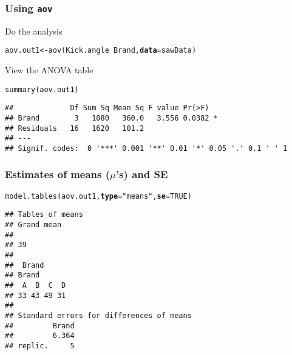 \documentclass[color=usenames,dvipsnames]{beamer}\usepackage[]{graphicx}\usepackage[]{color}
\makeatletter
\newcommand{\hlnum}[1]{\textcolor[rgb]{0.69,0.494,0}{#1}}%
\newcommand{\hlstr}[1]{\textcolor[rgb]{0.749,0.012,0.012}{#1}}%
\newcommand{\hlopt}[1]{\textcolor[rgb]{0,0,0}{#1}}%
\newcommand{\hlstd}[1]{\textcolor[rgb]{0,0,0}{#1}}%
\newcommand{\hlkwb}[1]{\textcolor[rgb]{0,0.341,0.682}{#1}}%
\newcommand{\hlkwc}[1]{\textcolor[rgb]{0,0,0}{\textbf{#1}}}%
\newcommand{\hlkwd}[1]{\textcolor[rgb]{0.004,0.004,0.506}{#1}}%
\newenvironment{kframe}{%
 \def\at@end@of@kframe{}%
 \ifinner\ifhmode%
  \def\at@end@of@kframe{\end{minipage}}%
  \begin{minipage}{\columnwidth}%
 \fi\fi%
 \def\FrameCommand##1{\hskip\@totalleftmargin \hskip-\fboxsep
 \colorbox{shadecolor}{##1}\hskip-\fboxsep
     \hskip-\linewidth \hskip-\@totalleftmargin \hskip\columnwidth}%
 \MakeFramed {\advance\hsize-\width
   \@totalleftmargin\z@ \linewidth\hsize
   \@setminipage}}%
 {\par\unskip\endMakeFramed%
 \at@end@of@kframe}
\newenvironment{knitrout}{}{} %
\makeatother
\begin{document}
\begin{frame}[fragile]
  \frametitle{Using {\tt aov}}
{%
  Do the analysis}
\begin{knitrout}
\color{fgcolor}\begin{kframe}
\begin{alltt}
\hlstd{aov.out1} \hlkwb{<-} \hlkwd{aov}\hlstd{(Kick.angle} \hlopt{~} \hlstd{Brand,} \hlkwc{data}\hlstd{=sawData)}
\end{alltt}
\end{kframe}
\end{knitrout}
\pause
\vfill
{%
  View the ANOVA table}
\begin{knitrout}\footnotesize
{}\color{fgcolor}\begin{kframe}
\begin{alltt}
\hlkwd{summary}\hlstd{(aov.out1)}
\end{alltt}
\begin{verbatim}
##             Df Sum Sq Mean Sq F value Pr(>F)  
## Brand        3   1080   360.0   3.556 0.0382 *
## Residuals   16   1620   101.2                 
## ---
## Signif. codes:  0 '***' 0.001 '**' 0.01 '*' 0.05 '.' 0.1 ' ' 1
\end{verbatim}
\end{kframe}
\end{knitrout}
\end{frame}



\begin{frame}[fragile]
  \frametitle{Estimates of means ($\mu$'s) and SE}
\begin{knitrout}
\color{fgcolor}\begin{kframe}
\begin{alltt}
\hlkwd{model.tables}\hlstd{(aov.out1,} \hlkwc{type}\hlstd{=}\hlstr{"means"}\hlstd{,} \hlkwc{se}\hlstd{=}\hlnum{TRUE}\hlstd{)}
\end{alltt}
\begin{verbatim}
## Tables of means
## Grand mean
##    
## 39 
## 
##  Brand 
## Brand
##  A  B  C  D 
## 33 43 49 31 
## 
## Standard errors for differences of means
##         Brand
##         6.364
## replic.     5
\end{verbatim}
\end{kframe}
\end{knitrout}
\end{frame}
\end{document}

